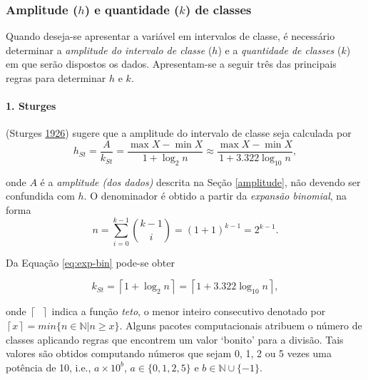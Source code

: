 \documentclass[
]{book}
\theoremstyle{definition}
\theoremstyle{definition}
\theoremstyle{definition}
\theoremstyle{remark}
\begin{document}
\hypertarget{amplitude-h-e-quantidade-k-de-classes}{%
\subsubsection*{\texorpdfstring{Amplitude (\(h\)) e quantidade (\(k\)) de classes}{Amplitude (h) e quantidade (k) de classes}}\label{amplitude-h-e-quantidade-k-de-classes}}

Quando deseja-se apresentar a variável em intervalos de classe, é necessário determinar a \emph{amplitude do intervalo de classe} (\(h\)) e a \emph{quantidade de classes} (\(k\)) em que serão dispostos os dados. Apresentam-se a seguir três das principais regras para determinar \(h\) e \(k\).

\hypertarget{sturges}{%
\paragraph*{1. Sturges}\label{sturges}}

(Sturges \protect\hyperlink{ref-sturges1926choice}{1926}) sugere que a amplitude do intervalo de classe seja calculada por
\begin{equation}
h_{St} = \frac{A}{k_{St}} = \frac{\max{X}-\min{X}}{1 + \log_{2}{n}} \approx \frac{\max{X}-\min{X}}{1 + 3.322 \log_{10}{n}},
\label{eq:h-sturges}
\end{equation}

onde \(A\) é a \emph{amplitude (dos dados)} descrita na Seção \ref{amplitude}, não devendo ser confundida com \(h\). O denominador é obtido a partir da \emph{expansão binomial}, na forma
\begin{equation}
n = \sum_{i=0}^{k-1} {k-1 \choose i} = (1+1)^{k-1} = 2^{k-1}.
\label{eq:exp-bin}
\end{equation}

Da Equação \eqref{eq:exp-bin} pode-se obter

\begin{equation}
k_{St} = \left\lceil 1 + \log_{2}{n} \right\rceil = \left\lceil 1 + 3.322 \log_{10}{n} \right\rceil,
\label{eq:k-sturges}
\end{equation}

onde \(\left\lceil \;\; \right\rceil\) indica a função \emph{teto}, o menor inteiro consecutivo denotado por \(\left\lceil x \right\rceil = min \{ n \in \mathbb{N} | n \ge x \}\). Alguns pacotes computacionais atribuem o número de classes aplicando regras que encontrem um valor `bonito' para a divisão. Tais valores são obtidos computando números que sejam 0, 1, 2 ou 5 vezes uma potência de 10, i.e., \(a \times 10^b\), \(a \in \{0,1,2,5\}\) e \(b \in \mathbb{N} \cup \{-1\}\).
\end{document}
